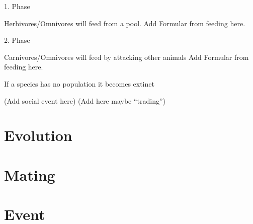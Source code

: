 1. Phase

Herbivores/Omnivores will feed from a pool.
Add Formular from feeding here.

2. Phase

Carnivores/Omnivores will feed by attacking other animals
Add Formular from feeding here.

If a species has no population it becomes extinct 

(Add social event here)
(Add here maybe "`trading"')

\section{Evolution}
\label{sec:gameplay:Evolution}

\section{Mating}
\label{sec:gameplay:Mating}

\section{Event}
\label{sec:gameplay:Event}
